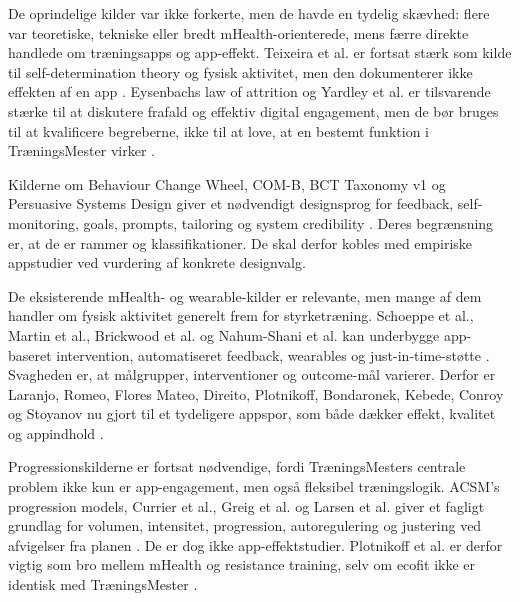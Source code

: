 De oprindelige kilder var ikke forkerte, men de havde en tydelig skævhed: flere var teoretiske, tekniske eller bredt mHealth-orienterede, mens færre direkte handlede om træningsapps og app-effekt. Teixeira et al. er fortsat stærk som kilde til self-determination theory og fysisk aktivitet, men den dokumenterer ikke effekten af en app \cite{teixeira2012_sdt_exercise}. Eysenbachs law of attrition og Yardley et al. er tilsvarende stærke til at diskutere frafald og effektiv digital engagement, men de bør bruges til at kvalificere begreberne, ikke til at love, at en bestemt funktion i TræningsMester virker \cite{eysenbach2005_law_of_attrition,yardley2016_effective_engagement_dbci}.

Kilderne om Behaviour Change Wheel, COM-B, BCT Taxonomy v1 og Persuasive Systems Design giver et nødvendigt designsprog for feedback, self-monitoring, goals, prompts, tailoring og system credibility \cite{michie2011_behaviour_change_wheel,michie2013_bct_taxonomy_v1,oinaskukkonen2009_persuasive_systems_design}. Deres begrænsning er, at de er rammer og klassifikationer. De skal derfor kobles med empiriske appstudier ved vurdering af konkrete designvalg.

De eksisterende mHealth- og wearable-kilder er relevante, men mange af dem handler om fysisk aktivitet generelt frem for styrketræning. Schoeppe et al., Martin et al., Brickwood et al. og Nahum-Shani et al. kan underbygge app-baseret intervention, automatiseret feedback, wearables og just-in-time-støtte \cite{schoeppe2016_app_interventions_review,martin2015_mactive,brickwood2019_wearable_trackers_meta,nahumshani2018_jitai_mobile_health}. Svagheden er, at målgrupper, interventioner og outcome-mål varierer. Derfor er Laranjo, Romeo, Flores Mateo, Direito, Plotnikoff, Bondaronek, Kebede, Conroy og Stoyanov nu gjort til et tydeligere appspor, som både dækker effekt, kvalitet og appindhold \cite{laranjo2021_apps_trackers_meta,romeo2019_smartphone_apps_pa_meta,floresmateo2015_mobile_apps_weight_pa_meta,direito2015_aimfit_rct,plotnikoff2023_ecofit_rct,bondaronek2018_quality_pa_apps,kebede2018_evidence_informed_pa_apps,conroy2014_bct_top_ranked_pa_apps,stoyanov2015_mobile_app_rating_scale}.

Progressionskilderne er fortsat nødvendige, fordi TræningsMesters centrale problem ikke kun er app-engagement, men også fleksibel træningslogik. ACSM's progression models, Currier et al., Greig et al. og Larsen et al. giver et fagligt grundlag for volumen, intensitet, progression, autoregulering og justering ved afvigelser fra planen \cite{acsm2009_progression_models,currier2026_acsm_resistance_training,greig2020_autoregulation_resistance_training,larsen2021_autoregulation_systematic_review}. De er dog ikke app-effektstudier. Plotnikoff et al. er derfor vigtig som bro mellem mHealth og resistance training, selv om ecofit ikke er identisk med TræningsMester \cite{plotnikoff2023_ecofit_rct}.

